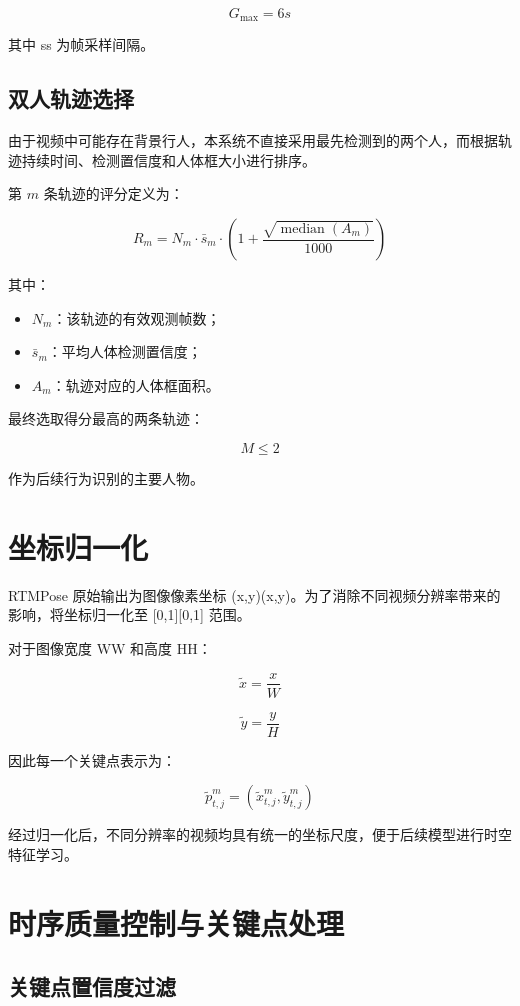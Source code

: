 \[
G_{\max}=6s
\]

其中 ss 为帧采样间隔。

\subsection{双人轨迹选择}

由于视频中可能存在背景行人，本系统不直接采用最先检测到的两个人，而根据轨迹持续时间、检测置信度和人体框大小进行排序。

第 \(m\) 条轨迹的评分定义为：

\[
R_m=
N_m\cdot\bar{s}_m
\cdot
\left(
1+
\frac{
\sqrt{\operatorname{median}(A_m)}
}{1000}
\right)
\]

其中：

\begin{itemize}
\item \(N_m\)：该轨迹的有效观测帧数；
\item \(\bar{s}_m\)：平均人体检测置信度；
\item \(A_m\)：轨迹对应的人体框面积。
\end{itemize}

最终选取得分最高的两条轨迹：

\[
M\leq2
\]

作为后续行为识别的主要人物。

\section{坐标归一化}

RTMPose 原始输出为图像像素坐标 (x,y)(x,y)。为了消除不同视频分辨率带来的影响，将坐标归一化至 [0,1][0,1] 范围。

对于图像宽度 WW 和高度 HH：

\[
\tilde{x}=\frac{x}{W}
\]

\[
\tilde{y}=\frac{y}{H}
\]

因此每一个关键点表示为：

\[
\tilde{p}_{t,j}^{m}
=
(\tilde{x}_{t,j}^{m},
\tilde{y}_{t,j}^{m})
\]

经过归一化后，不同分辨率的视频均具有统一的坐标尺度，便于后续模型进行时空特征学习。

\section{时序质量控制与关键点处理}

\subsection{关键点置信度过滤}

